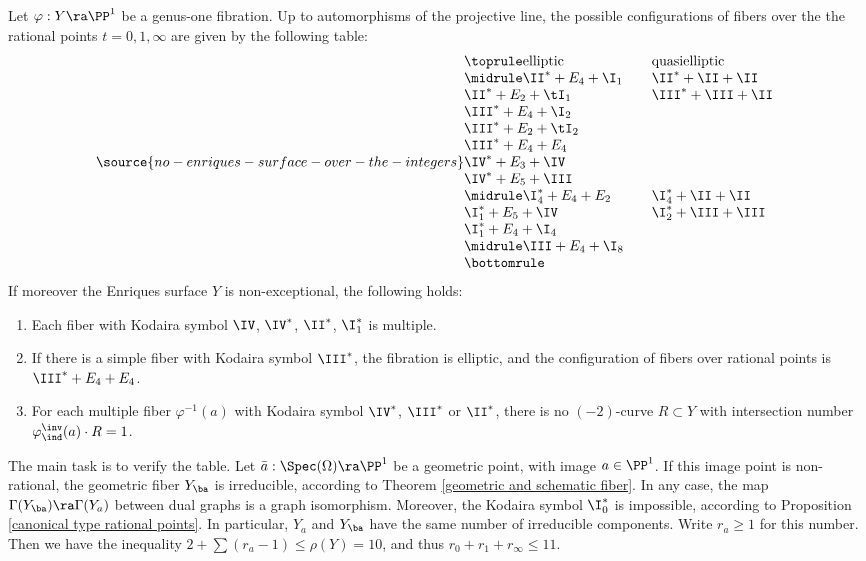 \begin{proposition}
\notready
\label{possible configurations}
Let $\varphi:Y\ra\PP^1$ be a genus-one fibration.
Up to  automorphisms of the projective line,
the possible configurations of fibers over the the rational points $t=0,1,\infty$ are given by
the following table:
\begin{equation}
\label{first restriction}
\source{no-enriques-surface-over-the-integers}
\begin{array}[c]{@{}lll}
\toprule
\text{elliptic}		& 		& \text{quasielliptic}\\
\midrule
\II^*+E_4+\I_1		&		& \II^*+\II+\II\\
\II^*+E_2+\tI_1		&		& \III^*+\III+\II\\
\III^*+E_4+\I_2\\
\III^*+E_2+\tI_2\\
\III^*+E_4+E_4\\
\IV^*+E_3+\IV\\
\IV^*+E_5+\III\\
\midrule
\I_4^* +E_4+E_2		&		& \I_4^*+\II+\II\\
\I_1^*+E_5+\IV      &		& \I_2^*+\III+\III\\
\I_1^*+E_4+\I_4\\
\midrule
\III+E_4+\I_8\\
\bottomrule
\end{array}
\end{equation}
If moreover the Enriques surface $Y$ is non-exceptional, the following holds:
\begin{enumerate}
\item
Each fiber  with Kodaira symbol  $\IV$, $\IV^*$,   $\II^*$, $\I_1^*$ is multiple.
\item
If there is a simple fiber with Kodaira symbol $\III^*$, the fibration is elliptic, and the configuration
of fibers over rational points is $\III^*+E_4+E_4$.
\item
For each multiple fiber $\varphi^{-1}(a)$ with Kodaira symbol $\IV^*$, $\III^*$ or $\II^*$, there is  no $(-2)$-curve
$R\subset Y$ with intersection number  $\varphi^\inv_\ind(a)\cdot R=1$.
\end{enumerate}
\end{proposition}

\proof
The main task is to verify the table.
Let $\bar{a}:\Spec(\Omega)\ra \PP^1$ be a geometric point, with image $a\in \PP^1$.
If this image point is non-rational, the geometric fiber $Y_\ba$ is irreducible,
according to Theorem \ref{geometric and schematic fiber}.
In any case,  the map $\Gamma(Y_\ba)\ra\Gamma(Y_a)$ between dual graphs is a graph isomorphism.
Moreover, the Kodaira symbol $\I_0^*$ is impossible, according to Proposition \ref{canonical type rational points}.
In particular, $Y_a$ and $Y_\ba$ have the same number of irreducible components. Write $r_a\geq 1$ for this number.
Then we have the inequality $2+\sum (r_a-1)\leq \rho(Y)=10$, and thus  $r_0+r_1+r_\infty\leq 11$.

